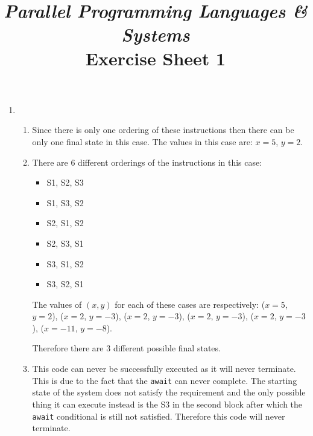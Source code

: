 \documentclass[12pt, a4paper]{article}
\title{\normalsize{\textit{Parallel Programming Languages \& Systems}} \\ \Huge Exercise Sheet 1}
\author{\theauthor}
\begin{document}
\maketitle
\thispagestyle{empty}

\begin{enumerate}

    \item

        \begin{enumerate}

            \item

                Since there is only one ordering of these instructions then there can
                be only one final state in this case. The values in this case are:
                $x=5$, $y=2$.

            \item

                There are 6 different orderings of the instructions in this case:

                \begin{itemize}

                    \item S1, S2, S3
                    \item S1, S3, S2
                    \item S2, S1, S2
                    \item S2, S3, S1
                    \item S3, S1, S2
                    \item S3, S2, S1

                \end{itemize}

                The values of $(x,y)$ for each of these cases are respectively:
                ($x=5$, $y=2$), ($x=2$, $y=-3$), ($x=2$, $y=-3$), ($x=2$,
                $y=-3$), ($x=2$, $y=-3$), ($x=-11$, $y=-8$).

                Therefore there are 3 different possible final states.

            \item

                This code can never be successfully executed as it will never
                terminate. This is due to the fact that the \texttt{await} can
                never complete. The starting state of the system does not
                satisfy the requirement and the only possible thing it can
                execute instead is the S3 in the second block after which the
                \texttt{await} conditional is still not satisfied. Therefore
                this code will never terminate.


\end{enumerate}
\end{enumerate}
\end{document}
